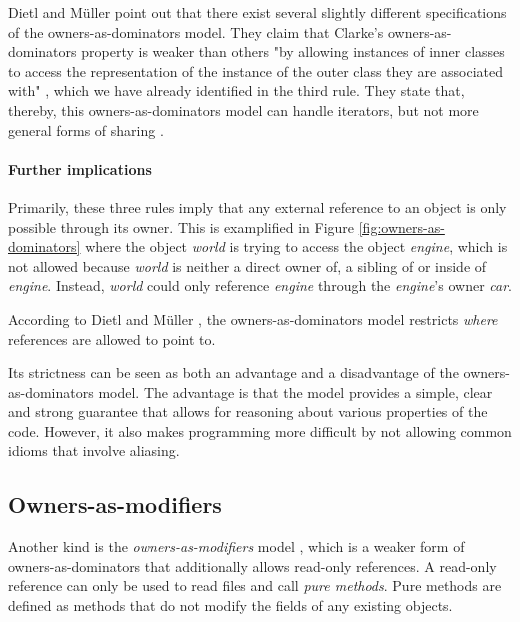 \documentclass[sigplan,11pt,nonacm]{acmart}
\begin{document}
Dietl and Müller \cite{lightweight-ownership} point out that there exist several slightly different specifications of the owners-as-dominators model.
They claim that Clarke's owners-as-dominators property \cite{ownership-types-survey} is weaker than others "by allowing instances of inner classes to access the representation of the instance of the outer class they are associated with" \cite{lightweight-ownership}, which we have already identified in the third rule.
They state that, thereby, this owners-as-dominators model can handle iterators, but not more general forms of sharing \cite{lightweight-ownership}.


\paragraph{Further implications}

Primarily, these three rules imply that any external reference to an object is only possible through its owner.
This is examplified in Figure \ref{fig:owners-as-dominators} where the object \emph{world} is trying to access the object \emph{engine}, which is not allowed because \emph{world} is neither a direct owner of, a sibling of or inside of \emph{engine}.
Instead, \emph{world} could only reference \emph{engine} through the \emph{engine}'s owner \emph{car}.

According to Dietl and Müller \cite{lightweight-ownership}, the owners-as-dominators model restricts \emph{where} references are allowed to point to.

Its strictness can be seen as both an advantage and a disadvantage of the owners-as-dominators model.
The advantage is that the model provides a simple, clear and strong guarantee that allows for reasoning about various properties of the code.
However, it also makes programming more difficult by not allowing common idioms that involve aliasing. \cite{ownership-types-survey}


\subsection{Owners-as-modifiers}
\label{sec:owners-as-modifiers}

Another kind is the \emph{owners-as-modifiers} model \cite{ownership-types-survey}, which is a weaker form of owners-as-dominators that additionally allows read-only references.
A read-only reference can only be used to read files and call \emph{pure methods}.
Pure methods are defined as methods that do not modify the fields of any existing objects. \cite{ownership-types-survey}
\end{document}
